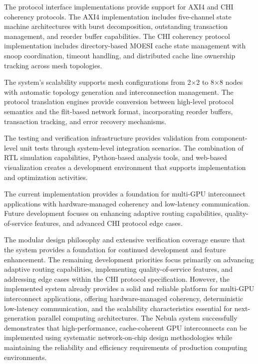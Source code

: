 \documentclass[12pt,letterpaper]{article}
\begin{document}
The protocol interface implementations provide support for AXI4 and CHI coherency protocols. The AXI4 implementation includes five-channel state machine architectures with burst decomposition, outstanding transaction management, and reorder buffer capabilities. The CHI coherency protocol implementation includes directory-based MOESI cache state management with snoop coordination, timeout handling, and distributed cache line ownership tracking across mesh topologies.

The system's scalability supports mesh configurations from 2×2 to 8×8 nodes with automatic topology generation and interconnection management. The protocol translation engines provide conversion between high-level protocol semantics and the flit-based network format, incorporating reorder buffers, transaction tracking, and error recovery mechanisms.

The testing and verification infrastructure provides validation from component-level unit tests through system-level integration scenarios. The combination of RTL simulation capabilities, Python-based analysis tools, and web-based visualization creates a development environment that supports implementation and optimization activities.

The current implementation provides a foundation for multi-GPU interconnect applications with hardware-managed coherency and low-latency communication. Future development focuses on enhancing adaptive routing capabilities, quality-of-service features, and advanced CHI protocol edge cases.

The modular design philosophy and extensive verification coverage ensure that the system provides a foundation for continued development and feature enhancement. The remaining development priorities focus primarily on advancing adaptive routing capabilities, implementing quality-of-service features, and addressing edge cases within the CHI protocol specification. However, the implemented system already provides a solid and reliable platform for multi-GPU interconnect applications, offering hardware-managed coherency, deterministic low-latency communication, and the scalability characteristics essential for next-generation parallel computing architectures. The Nebula system successfully demonstrates that high-performance, cache-coherent GPU interconnects can be implemented using systematic network-on-chip design methodologies while maintaining the reliability and efficiency requirements of production computing environments.
\end{document}
